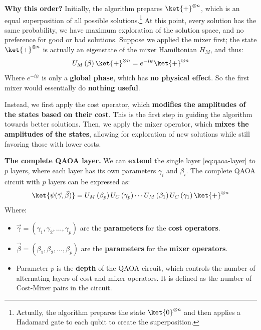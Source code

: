 \noindent
\textcolor{Green3}{ \textbf{Why this order?}} Initially, the algorithm prepares $\ket{+}^{\otimes n}$, which is an equal superposition of all possible solutions.\footnote{%
    Actually, the algorithm prepares the state $\ket{0}^{\otimes n}$ and then applies a Hadamard gate to each qubit to create the superposition.%
} At this point, every solution has the same probability, we have maximum exploration of the solution space, and no preference for good or bad solutions. Suppose we applied the mixer first; the state $\ket{+}^{\otimes n}$ is actually an eigenstate of the mixer Hamiltonian $H_M$, and thus:
\begin{equation*}
    U_M\left(\beta\right) \ket{+}^{\otimes n} = e^{-i \psi} \ket{+}^{\otimes n}
\end{equation*}
Where $e^{-i \psi}$ is only a \textbf{global phase}, which has \textbf{no physical effect}. So the first mixer would essentially do \textbf{nothing useful}.

\highspace
Instead, we first apply the cost operator, which \textbf{modifies the amplitudes of the states based on their cost}. This is the first step in guiding the algorithm towards better solutions. Then, we apply the mixer operator, which \textbf{mixes the amplitudes of the states}, allowing for exploration of new solutions while still favoring those with lower costs.

\highspace
\textcolor{Green3}{ \textbf{The complete QAOA layer.}} We can \textbf{extend} the single layer \autoref{eq:qaoa-layer} to $p$ layers, where each layer has its own parameters $\gamma_i$ and $\beta_i$. The complete QAOA circuit with $p$ layers can be expressed as:
\begin{equation}
    \ket{\psi(\vec{\gamma}, \vec{\beta})} = U_M\left(\beta_p\right) U_C\left(\gamma_p\right) \cdots U_M\left(\beta_1\right) U_C\left(\gamma_1\right) \ket{+}^{\otimes n}
\end{equation}
Where:
\begin{itemize}
    \item $\vec{\gamma} = \left(\gamma_1, \gamma_2, \ldots, \gamma_p\right)$ are the \textbf{parameters} for the \textbf{cost operators}.
    \item $\vec{\beta} =  \left(\beta_1, \beta_2, \ldots, \beta_p\right)$ are the \textbf{parameters} for the \textbf{mixer operators}.
    \item Parameter $p$ is the \textbf{depth} of the QAOA circuit, which controls the number of alternating layers of cost and mixer operators. It is defined as the number of Cost-Mixer pairs in the circuit.
\end{itemize}
